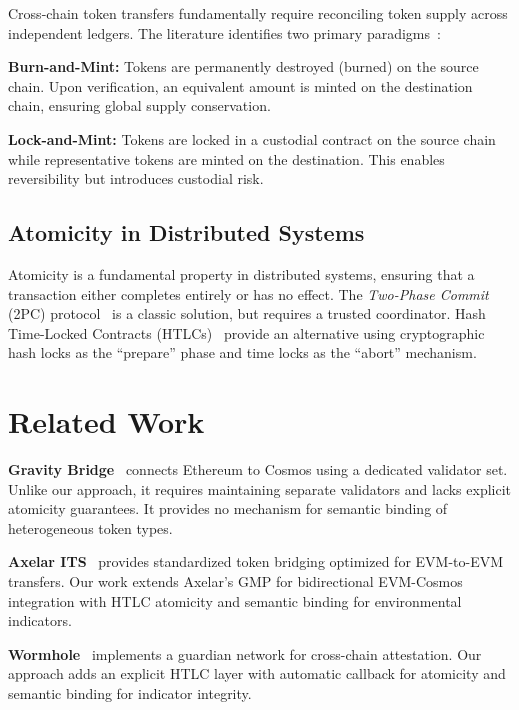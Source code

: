 \documentclass[conference,10pt]{IEEEtran}
\begin{document}
Cross-chain token transfers fundamentally require reconciling token supply across independent ledgers. The literature identifies two primary paradigms~\cite{zamyatin2021,robinson2022}:

\textbf{Burn-and-Mint:} Tokens are permanently destroyed (burned) on the source chain. Upon verification, an equivalent amount is minted on the destination chain, ensuring global supply conservation.

\textbf{Lock-and-Mint:} Tokens are locked in a custodial contract on the source chain while representative tokens are minted on the destination. This enables reversibility but introduces custodial risk.

\subsection{Atomicity in Distributed Systems}

Atomicity is a fundamental property in distributed systems, ensuring that a transaction either completes entirely or has no effect. The \textit{Two-Phase Commit} (2PC) protocol~\cite{gray1978} is a classic solution, but requires a trusted coordinator. Hash Time-Locked Contracts (HTLCs)~\cite{herlihy2018} provide an alternative using cryptographic hash locks as the ``prepare'' phase and time locks as the ``abort'' mechanism.

\section{Related Work}
\label{sec:related}

\textbf{Gravity Bridge}~\cite{gravity2022} connects Ethereum to Cosmos using a dedicated validator set. Unlike our approach, it requires maintaining separate validators and lacks explicit atomicity guarantees. It provides no mechanism for semantic binding of heterogeneous token types.

\textbf{Axelar ITS}~\cite{axelar2024its} provides standardized token bridging optimized for EVM-to-EVM transfers. Our work extends Axelar's GMP for bidirectional EVM-Cosmos integration with HTLC atomicity and semantic binding for environmental indicators.

\textbf{Wormhole}~\cite{wormhole2024} implements a guardian network for cross-chain attestation. Our approach adds an explicit HTLC layer with automatic callback for atomicity and semantic binding for indicator integrity.
\end{document}
